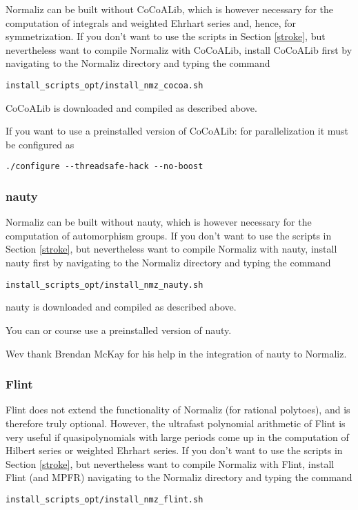 \documentclass[12pt,a4paper]{scrartcl}
\theoremstyle{definition}
\begin{document}
Normaliz can be built without CoCoALib, which is however necessary for the computation of integrals and weighted Ehrhart series and, hence,  for symmetrization. If you don't want to use the scripts in Section \ref{stroke}, but nevertheless want to compile Normaliz with CoCoALib, install  CoCoALib first by navigating to the Normaliz directory and typing the command
\begin{Verbatim}
install_scripts_opt/install_nmz_cocoa.sh
\end{Verbatim}
CoCoALib is downloaded and compiled as described above.

If you want to use a preinstalled version of CoCoALib: for parallelization  it must be configured as
\begin{Verbatim}
./configure --threadsafe-hack --no-boost 
\end{Verbatim}

\subsubsection{nauty}

Normaliz can be built without nauty, which is however necessary for the computation of automorphism groups. If you don't want to use the scripts in Section \ref{stroke}, but nevertheless want to compile Normaliz with nauty, install  nauty first by navigating to the Normaliz directory and typing the command
\begin{Verbatim}
install_scripts_opt/install_nmz_nauty.sh
\end{Verbatim}
nauty is downloaded and compiled as described above.

You can or course use a preinstalled version of nauty.

Wev thank Brendan McKay for his help in the integration of nauty to Normaliz.

\subsubsection{Flint}

Flint does not extend the functionality of Normaliz (for rational polytoes), and is therefore truly optional.
However, the ultrafast polynomial arithmetic of Flint is very useful if quasipolynomials with large periods come up in the computation of Hilbert series or weighted Ehrhart series. If you don't want to use the scripts in Section \ref{stroke}, but nevertheless want to compile Normaliz with Flint,  install Flint (and MPFR) navigating to the Normaliz directory and typing the command
\begin{Verbatim}
install_scripts_opt/install_nmz_flint.sh
\end{Verbatim}
 
\end{document}
